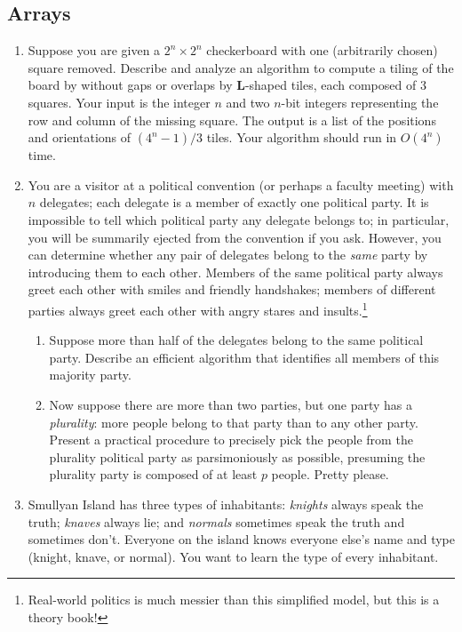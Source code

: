 \begin{exercises}
\subsection*{Arrays}

\begin{enumerate}[label=\arabic*.,ref=\thechapter.\arabic*,leftmargin=*,align=left,itemsep=1.5ex plus 0.5ex,resume]
\item Suppose you are given a $2^n \times 2^n$ checkerboard with one (arbitrarily chosen) square removed. Describe and analyze an algorithm to compute a tiling of the board by without gaps or overlaps by \textsf{\textbf{L}}-shaped tiles, each composed of 3 squares. Your input is the integer $n$ and two $n$-bit integers representing the row and column of the missing square. The output is a list of the positions and orientations of $(4^n - 1)/3$ tiles. Your algorithm should run in $O(4^n)$ time. 
\item You are a visitor at a political convention (or perhaps a faculty meeting) with $n$ delegates; each delegate is a member of exactly one political party. It is impossible to tell which political party any delegate belongs to; in particular, you will be summarily ejected from the convention if you ask. However, you can determine whether any pair of delegates belong to the \emph{same} party by introducing them to each other. Members of the same political party always greet each other with smiles and friendly handshakes; members of different parties always greet each other with angry stares and insults.\footnote{Real-world politics is much messier than this simplified model, but this is a theory book!}
\begin{enumerate}
\item Suppose more than half of the delegates belong to the same political party. Describe an efficient algorithm that identifies all members of this majority party.
\item Now suppose there are more than two parties, but one party has a \emph{plurality}: more people belong to that party than to any other party. Present a practical procedure to precisely pick the people from the plurality political party as parsimoniously as possible, presuming the plurality party is composed of at least $p$ people. Pretty please.
\end{enumerate}
\item Smullyan Island has three types of inhabitants: \emph{knights} always speak the truth; \emph{knaves} always lie; and \emph{normals} sometimes speak the truth and sometimes don’t. Everyone on the island knows everyone else’s name and type (knight, knave, or normal). You want to learn the type of every inhabitant.


\end{enumerate}
\end{exercises}
